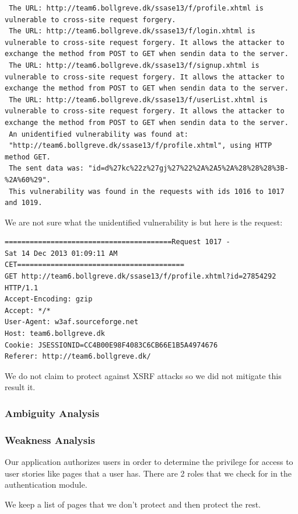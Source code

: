 \documentclass[a4paper]{article}
\begin{document}
\begin{verbatim}
 The URL: http://team6.bollgreve.dk/ssase13/f/profile.xhtml is 
vulnerable to cross-site request forgery.
 The URL: http://team6.bollgreve.dk/ssase13/f/login.xhtml is 
vulnerable to cross-site request forgery. It allows the attacker to 
exchange the method from POST to GET when sendin data to the server.
 The URL: http://team6.bollgreve.dk/ssase13/f/signup.xhtml is 
vulnerable to cross-site request forgery. It allows the attacker to 
exchange the method from POST to GET when sendin data to the server.
 The URL: http://team6.bollgreve.dk/ssase13/f/userList.xhtml is 
vulnerable to cross-site request forgery. It allows the attacker to 
exchange the method from POST to GET when sendin data to the server.
 An unidentified vulnerability was found at: 
 "http://team6.bollgreve.dk/ssase13/f/profile.xhtml", using HTTP method GET. 
 The sent data was: "id=d%27kc%22z%27gj%27%22%2A%2A5%2A%28%28%28%3B-%2A%60%29". 
 This vulnerability was found in the requests with ids 1016 to 1017 and 1019.
\end{verbatim}

We are not sure what the unidentified vulnerability is but here is the request:
\begin{verbatim}
========================================Request 1017 - 
Sat 14 Dec 2013 01:09:11 AM CET========================================
GET http://team6.bollgreve.dk/ssase13/f/profile.xhtml?id=27854292 HTTP/1.1
Accept-Encoding: gzip
Accept: */*
User-Agent: w3af.sourceforge.net
Host: team6.bollgreve.dk
Cookie: JSESSIONID=CC4B00E98F4083C6CB66E1B5A4974676
Referer: http://team6.bollgreve.dk/
\end{verbatim}

We do not claim to protect against XSRF attacks so we did not mitigate this result it.


\subsubsection{Ambiguity Analysis}


\subsubsection{Weakness Analysis}

Our application authorizes users in order to determine the privilege for access to user stories like pages that a user has. There are 2 roles that we check for in the authentication module.

We keep a list of pages that we don't protect and then protect the rest.
\end{document}
